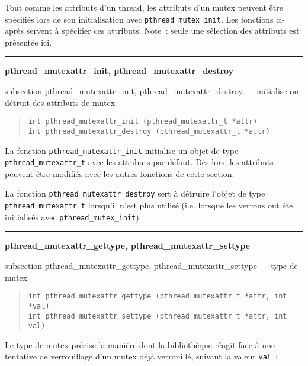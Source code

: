 \documentclass [twoside] {report}
\newcommand {\primitive} [1]
    {
	\phantomsection
	{\large \bf #1}
	\addcontentsline {toc} {subsection} {#1}
    }
\newcommand {\separation}
    {
	\vspace {5mm}
	\nopagebreak
	\hrule
    }
\begin{document}
Tout comme les attributs d'un thread, les attributs d'un
mutex peuvent être spécifiés lors de son initialisation avec
\verb|pthread_mutex_init|. Les fonctions ci-après servent à spécifier
ces attributs.
Note~: seule une sélection des attributs est présentée ici.

\separation
\primitive {pthread\_mutexattr\_init, pthread\_mutexattr\_destroy} ---
initialise ou détruit des attributs de mutex

\begin {quote}
\begin {verbatim}
int pthread_mutexattr_init (pthread_mutexattr_t *attr)
int pthread_mutexattr_destroy (pthread_mutexattr_t *attr)
\end{verbatim}
\end {quote}

La fonction \verb|pthread_mutexattr_init| initialise un objet de type
\verb|pthread_mutexattr_t| avec les attributs par défaut. Dès lors, les
attributs peuvent être modifiés avec les autres fonctions de cette
section.

La fonction \verb|pthread_mutexattr_destroy| sert à détruire l'objet de type
\verb|pthread_mutexattr_t| lorsqu'il n'est plus utilisé (i.e.  lorsque les
verrous ont été initialisés avec \verb|pthread_mutex_init|).


\separation
\primitive {pthread\_mutexattr\_gettype, pthread\_mutexattr\_settype} --- type de mutex

\begin {quote}
\begin {verbatim}
int pthread_mutexattr_gettype (pthread_mutexattr_t *attr, int *val)
int pthread_mutexattr_settype (pthread_mutexattr_t *attr, int val)
\end{verbatim}
\end {quote}

Le type de mutex précise la manière dont la bibliothèque réagit
face à une tentative de verrouillage d'un mutex déjà verrouillé,
suivant la valeur \texttt {val}~:
\end{document}
